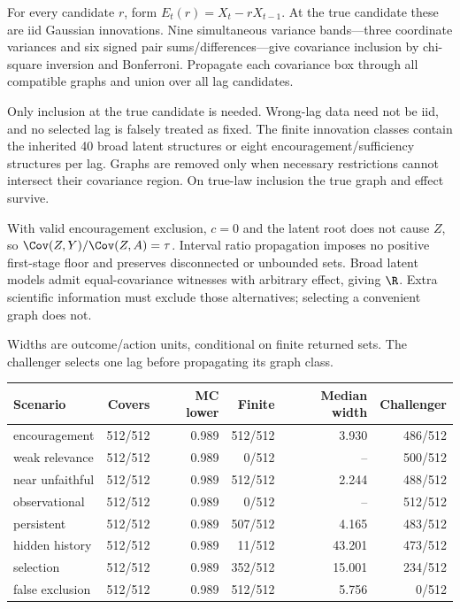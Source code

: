 For every candidate $r$, form $E_t(r)=X_t-rX_{t-1}$. At the true candidate these are iid Gaussian innovations. Nine simultaneous variance bands---three coordinate variances and six signed pair sums/differences---give covariance inclusion by chi-square inversion and Bonferroni. Propagate each covariance box through all compatible graphs and union over all lag candidates.

Only inclusion at the true candidate is needed. Wrong-lag data need not be iid, and no selected lag is falsely treated as fixed. The finite innovation classes contain the inherited 40 broad latent structures or eight encouragement/sufficiency structures per lag. Graphs are removed only when necessary restrictions cannot intersect their covariance region. On true-law inclusion the true graph and effect survive.

With valid encouragement exclusion, $c=0$ and the latent root does not cause $Z$, so $\Cov(Z,Y)/\Cov(Z,A)=\tau$. Interval ratio propagation imposes no positive first-stage floor and preserves disconnected or unbounded sets. Broad latent models admit equal-covariance witnesses with arbitrary effect, giving $\R$. Extra scientific information must exclude those alternatives; selecting a convenient graph does not.

Widths are outcome/action units, conditional on finite returned sets. The challenger selects one lag before propagating its graph class.

\begin{center}\footnotesize\begin{tabular}{lrrrrr}\toprule
Scenario & Covers & MC lower & Finite & Median width & Challenger\\
\midrule
encouragement & 512/512 & 0.989 & 512/512 & 3.930 & 486/512 \\
weak relevance & 512/512 & 0.989 & 0/512 & -- & 500/512 \\
near unfaithful & 512/512 & 0.989 & 512/512 & 2.244 & 488/512 \\
observational & 512/512 & 0.989 & 0/512 & -- & 512/512 \\
persistent & 512/512 & 0.989 & 507/512 & 4.165 & 483/512 \\
hidden history & 512/512 & 0.989 & 11/512 & 43.201 & 473/512 \\
selection & 512/512 & 0.989 & 352/512 & 15.001 & 234/512 \\
false exclusion & 512/512 & 0.989 & 512/512 & 5.756 & 0/512 \\
\bottomrule\end{tabular}\end{center}


